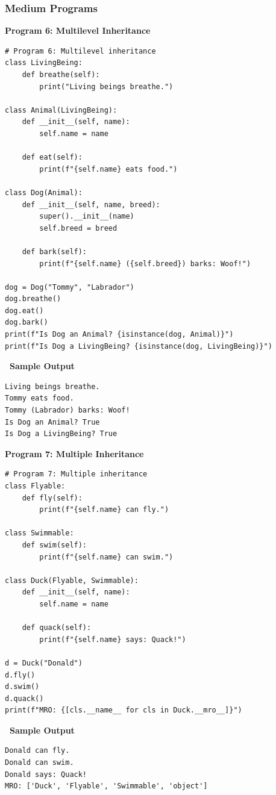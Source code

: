 \documentclass[12pt,a4paper]{article}
\newcommand{\outhead}{\noindent\colorbox{cmrgreen!25}%
  {\textbf{\small\color{cmrdark}~Sample Output~}}\par\vspace{-1pt}}
\begin{document}
\subsubsection{Medium Programs}

\textbf{Program 6: Multilevel Inheritance}

\begin{lstlisting}
# Program 6: Multilevel inheritance
class LivingBeing:
    def breathe(self):
        print("Living beings breathe.")

class Animal(LivingBeing):
    def __init__(self, name):
        self.name = name

    def eat(self):
        print(f"{self.name} eats food.")

class Dog(Animal):
    def __init__(self, name, breed):
        super().__init__(name)
        self.breed = breed

    def bark(self):
        print(f"{self.name} ({self.breed}) barks: Woof!")

dog = Dog("Tommy", "Labrador")
dog.breathe()
dog.eat()
dog.bark()
print(f"Is Dog an Animal? {isinstance(dog, Animal)}")
print(f"Is Dog a LivingBeing? {isinstance(dog, LivingBeing)}")
\end{lstlisting}

\outhead
\begin{lstlisting}[style=outputstyle]
Living beings breathe.
Tommy eats food.
Tommy (Labrador) barks: Woof!
Is Dog an Animal? True
Is Dog a LivingBeing? True
\end{lstlisting}

\vspace{0.5cm}

\textbf{Program 7: Multiple Inheritance}

\begin{lstlisting}
# Program 7: Multiple inheritance
class Flyable:
    def fly(self):
        print(f"{self.name} can fly.")

class Swimmable:
    def swim(self):
        print(f"{self.name} can swim.")

class Duck(Flyable, Swimmable):
    def __init__(self, name):
        self.name = name

    def quack(self):
        print(f"{self.name} says: Quack!")

d = Duck("Donald")
d.fly()
d.swim()
d.quack()
print(f"MRO: {[cls.__name__ for cls in Duck.__mro__]}")
\end{lstlisting}

\outhead
\begin{lstlisting}[style=outputstyle]
Donald can fly.
Donald can swim.
Donald says: Quack!
MRO: ['Duck', 'Flyable', 'Swimmable', 'object']
\end{lstlisting}
\end{document}

